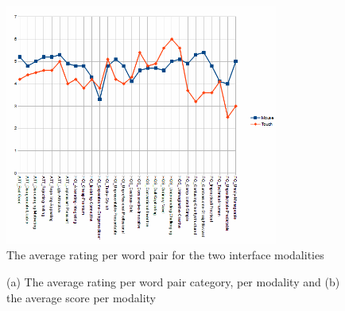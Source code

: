 \documentclass[a4paper,10pt]{report}
\begin{document}
\begin{figure}
  \centering
  \includegraphics[width=0.8\textwidth]{images/pairs}
  \caption{The average rating per word pair for the two interface modalities}
  \label{fig:pairs}
\end{figure}

\begin{figure}
  \caption{(a) The average rating per word pair category, per modality and (b) the average score per modality}
\end{figure}
\end{document}
